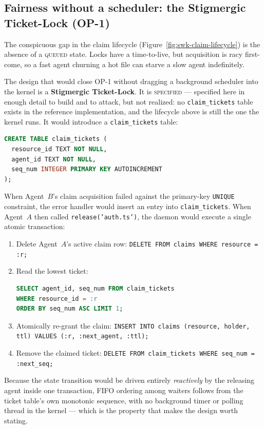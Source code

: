 \documentclass[11pt,a4paper]{article}
\newcommand{\Designed}{{\textcolor{hhgray}{\textsc{specified}}}}
\theoremstyle{definition}
\theoremstyle{remark}
\begin{document}
\subsection{Fairness without a scheduler: the Stigmergic Ticket-Lock (OP-1)}

The conspicuous gap in the claim lifecycle (Figure~\ref{fig:swk-claim-lifecycle}) is
the absence of a \textsc{queued} state. Locks have a time-to-live, but acquisition is
racy first-come, so a fast agent churning a hot file can starve a slow agent
indefinitely.

The design that would close OP-1 without dragging a background scheduler into the
kernel is a \textbf{Stigmergic Ticket-Lock}. It is \Designed{} --- specified here in
enough detail to build and to attack, but not realized: no \texttt{claim\_tickets}
table exists in the reference implementation, and the lifecycle above is still the
one the kernel runs. It would introduce a \texttt{claim\_tickets} table:
\begin{lstlisting}[language=SQL]
CREATE TABLE claim_tickets (
  resource_id TEXT NOT NULL,
  agent_id TEXT NOT NULL,
  seq_num INTEGER PRIMARY KEY AUTOINCREMENT
);
\end{lstlisting}
When Agent~$B$'s claim acquisition failed against the primary-key \texttt{UNIQUE} constraint, the error handler would insert an entry into \texttt{claim\_tickets}. When Agent~$A$ then called \texttt{release('auth.ts')}, the daemon would execute a single atomic transaction:
\begin{enumerate}[leftmargin=1.4em,itemsep=1pt]
\item Delete Agent~$A$'s active claim row: \texttt{DELETE FROM claims WHERE resource = :r;}
\item Read the lowest ticket:
\begin{lstlisting}[language=SQL,basicstyle=\small\ttfamily]
SELECT agent_id, seq_num FROM claim_tickets
WHERE resource_id = :r
ORDER BY seq_num ASC LIMIT 1;
\end{lstlisting}
\item Atomically re-grant the claim: \texttt{INSERT INTO claims (resource, holder, ttl) VALUES (:r, :next\_agent, :ttl);}
\item Remove the claimed ticket: \texttt{DELETE FROM claim\_tickets WHERE seq\_num = :next\_seq;}
\end{enumerate}
Because the state transition would be driven entirely \emph{reactively} by the
releasing agent inside one transaction, FIFO ordering among waiters follows from the
ticket table's own monotonic sequence, with no background timer or polling thread in
the kernel --- which is the property that makes the design worth stating.
\end{document}
